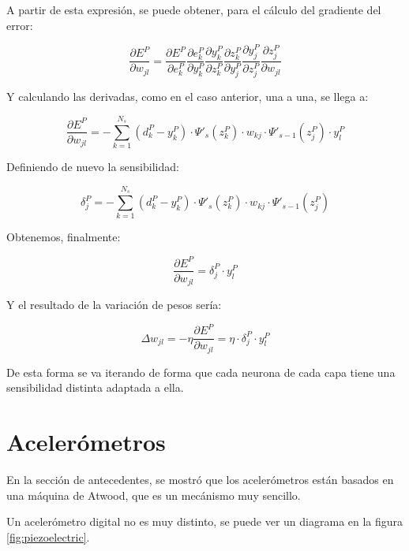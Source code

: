 \documentclass[12pt]{book}
\numberwithin{equation}{section}
\begin{document}
A partir de esta expresión, se puede obtener, para el cálculo del gradiente del error:

\begin{equation}
\frac{\partial E^P}{\partial w_{jl}} = \frac{\partial E^P}{\partial e_{k}^P} \frac{\partial e^P_k}{\partial y_{k}^P} \frac{\partial y^P_k}{\partial z_{k}^P} \frac{\partial z^P_k}{\partial y_j^P} \frac{\partial y^P_j}{\partial z_j^P} \frac{\partial z^P_j}{\partial w_{jl}}
\end{equation}

Y calculando las derivadas, como en el caso anterior, una a una, se llega a:

\begin{equation}
\frac{\partial E^P}{\partial w_{jl}} =-\sum _{k=1}^{N_s}(d_k^P-y_k^P) \cdot \Psi ' _s(z_k^P) \cdot w_{kj} \cdot \Psi '_{s-1}(z_j^P) \cdot y_l^P
\end{equation}

Definiendo de nuevo la sensibilidad:

\begin{equation}
\delta _j^P = -\sum _{k=1}^{N_s}(d_k^P-y_k^P) \cdot \Psi ' _s(z_k^P) \cdot w_{kj} \cdot \Psi '_{s-1}(z_j^P)
\end{equation}

Obtenemos, finalmente:

\begin{equation}
\frac{\partial E^P}{\partial w_{jl}} = \delta _j^P \cdot y_l^P
\end{equation}

Y el resultado de la variación de pesos sería: 

\begin{equation}
\Delta w_{jl} = -\eta \frac{\partial E^P}{\partial w_{jl}} = \eta \cdot \delta _j^P \cdot y_l^P
\end{equation}

De esta forma se va iterando de forma que cada neurona de cada capa tiene una sensibilidad distinta adaptada a ella.

\section{Acelerómetros}

En la sección de antecedentes, se mostró que los acelerómetros están basados en una máquina de Atwood, que es un mecánismo muy sencillo.

Un acelerómetro digital no es muy distinto, se puede ver un diagrama en la figura \ref{fig:piezoelectric}.
\end{document}
